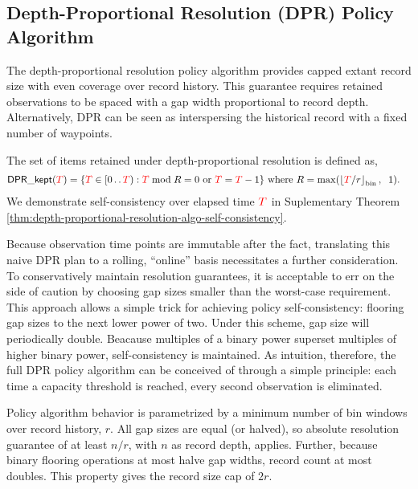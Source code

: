 \subsection{Depth-Proportional Resolution (DPR) Policy Algorithm}
\label{sec:depth-proportional-resolution-algo}

The depth-proportional resolution policy algorithm provides capped extant record size with even coverage over record history.
This guarantee requires retained observations to be spaced with a gap width proportional to record depth.
Alternatively, DPR can be seen as interspersing the historical record with a fixed number of waypoints.

The set of items retained under depth-proportional resolution is defined as,
\begin{align}
\mathsf{DPR\_kept}(\colorT)
&= \{
\colorTbar \in [0\twodots\colorT)
: \colorTbar \bmod R = 0 \text{ or } \colorTbar = \colorT - 1
\}
\text{ where }
R = \max(\left \lfloor \colorT / r \right \rfloor_{\mathrm{bin}}, \;\; 1).
\label{eqn:fr_kept}
\end{align}
We demonstrate self-consistency over elapsed time $\colorT$ in Suplementary Theorem \ref{thm:depth-proportional-resolution-algo-self-consistency}.

Because observation time points are immutable after the fact, translating this naive DPR plan to a rolling, ``online'' basis necessitates a further consideration.
To conservatively maintain resolution guarantees, it is acceptable to err on the side of caution by choosing gap sizes smaller than the worst-case requirement.
This approach allows a simple trick for achieving policy self-consistency: flooring gap sizes to the next lower power of two.
Under this scheme, gap size will periodically double.
Beacause multiples of a binary power superset multiples of higher binary power, self-consistency is maintained.
As intuition, therefore, the full DPR policy algorithm can be conceived of through a simple principle: %
each time a capacity threshold is reached, every second observation is eliminated.

Policy algorithm behavior is parametrized by a minimum number of bin windows over record history, $r$.
All gap sizes are equal (or halved), so absolute resolution guarantee of at least $n/r$, with $n$ as record depth, applies.
Further, because binary flooring operations at most halve gap widths, record count at most doubles.
This property gives the record size cap of $2r$.

